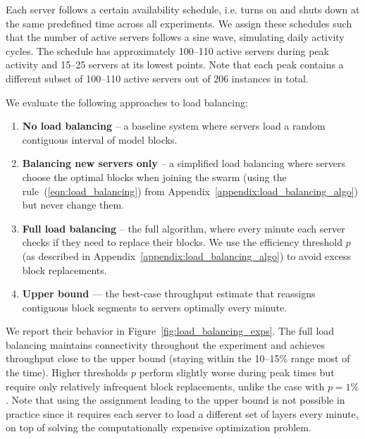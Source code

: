 Each server follows a certain availability schedule, i.e. turns on and shuts down at the same predefined time across all experiments.
We assign these schedules such that the number of active servers follows a sine wave, simulating daily activity cycles.
The schedule has approximately 100--110 active servers during peak activity and 15--25 servers at its lowest points.
Note that each peak contains a different subset of 100--110 active servers out of 206 instances in total.

We evaluate the following approaches to load balancing:
\begin{enumerate}
  \vspace{-1px}
  \item \textbf{No load balancing} -- a baseline system where servers load a random contiguous interval of model blocks.
  \vspace{-1px}
  \item \textbf{Balancing new servers only} -- a simplified load balancing where servers choose the optimal blocks when joining the swarm (using the rule~(\ref{eqn:load_balancing}) from Appendix~\ref{appendix:load_balancing_algo}) but never change them.
  \vspace{-1px}
  \item \textbf{Full load balancing} -- the full algorithm, where every minute each server checks if they need to replace their blocks. We use the efficiency threshold $p$ (as described in Appendix~\ref{appendix:load_balancing_algo}) to avoid excess block replacements.
  \vspace{-1px}
  \item \textbf{Upper bound} --- the best-case throughput estimate that reassigns contiguous block segments to servers optimally every minute.
  \vspace{-1px}
\end{enumerate}

We report their behavior in Figure~\ref{fig:load_balancing_exps}. The full load balancing maintains connectivity throughout the experiment and achieves throughput close to the upper bound (staying within the 10--15\% range most of the time). Higher thresholds $p$ perform slightly worse during peak times but require only relatively infrequent block replacements, unlike the case with $p=1\%$. Note that using the assignment leading to the upper bound is not possible in practice since it requires each server to load a different set of layers every minute, on top of solving the computationally expensive optimization problem.


